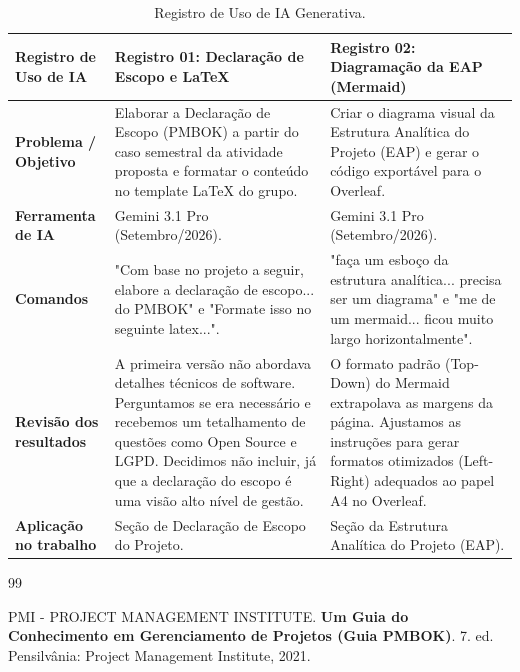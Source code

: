 \documentclass[a4paper]{article}
\begin{document}
\begin{table}[htbp]
    \centering
    \renewcommand{\arraystretch}{1.5}
    \small
    \begin{tabular}{|p{3cm}|p{6cm}|p{6cm}|}
        \hline
        \textbf{Registro de Uso de IA} & \textbf{Registro 01: Declaração de Escopo e LaTeX} & \textbf{Registro 02: Diagramação da EAP (Mermaid)} \\
        \hline
        \textbf{Problema / Objetivo} & Elaborar a Declaração de Escopo (PMBOK) a partir do caso semestral da atividade proposta e formatar o conteúdo no template LaTeX do grupo. & Criar o diagrama visual da Estrutura Analítica do Projeto (EAP) e gerar o código exportável para o Overleaf. \\
        \hline
        \textbf{Ferramenta de IA} & Gemini 3.1 Pro (Setembro/2026). & Gemini 3.1 Pro (Setembro/2026). \\
        \hline
        \textbf{Comandos} & "Com base no projeto a seguir, elabore a declaração de escopo... do PMBOK" e "Formate isso no seguinte latex...". & "faça um esboço da estrutura analítica... precisa ser um diagrama" e "me de um mermaid... ficou muito largo horizontalmente". \\
        \hline
        \textbf{Revisão dos resultados} & A primeira versão não abordava detalhes técnicos de software. Perguntamos se era necessário e recebemos um tetalhamento de questões como Open Source e LGPD. Decidimos não incluir, já que a declaração do escopo é uma visão alto nível de gestão. & O formato padrão (Top-Down) do Mermaid extrapolava as margens da página. Ajustamos as instruções para gerar formatos otimizados (Left-Right) adequados ao papel A4 no Overleaf. \\
        \hline
        \textbf{Aplicação no trabalho} & Seção de Declaração de Escopo do Projeto. & Seção da Estrutura Analítica do Projeto (EAP). \\
        \hline
    \end{tabular}
    \caption{Registro de Uso de IA Generativa.}
    \label{tab:uso_ia}
\end{table}

\begin{thebibliography}{99}

PMI - PROJECT MANAGEMENT INSTITUTE. \textbf{Um Guia do Conhecimento em Gerenciamento de Projetos (Guia PMBOK)}. 7. ed. Pensilvânia: Project Management Institute, 2021.

\end{thebibliography}
\end{document}
